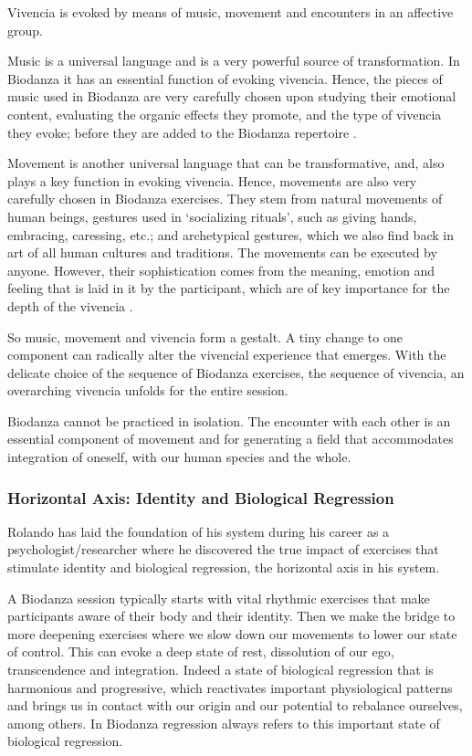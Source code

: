 \documentclass[
  11pt,
]{book}
\begin{document}
Vivencia is evoked by means of music, movement and encounters in an affective group.

Music is a universal language and is a very powerful source of transformation. In Biodanza it has an essential function of evoking vivencia. Hence, the pieces of music used in Biodanza are very carefully chosen upon studying their emotional content, evaluating the organic effects they promote, and the type of vivencia they evoke; before they are added to the Biodanza repertoire \citep{toro2008}.

Movement is another universal language that can be transformative, and, also plays a key function in evoking vivencia. Hence, movements are also very carefully chosen in Biodanza exercises. They stem from natural movements of human beings, gestures used in `socializing rituals', such as giving hands, embracing, caressing, etc.; and archetypical gestures, which we also find back in art of all human cultures and traditions. The movements can be executed by anyone. However, their sophistication comes from the meaning, emotion and feeling that is laid in it by the participant, which are of key importance for the depth of the vivencia \citep{toro2008}.

So music, movement and vivencia form a gestalt. A tiny change to one component can radically alter the vivencial experience that emerges.
With the delicate choice of the sequence of Biodanza exercises, the sequence of vivencia, an overarching vivencia unfolds for the entire session.

Biodanza cannot be practiced in isolation. The encounter with each other is an essential component of movement and for generating a field that accommodates integration of oneself, with our human species and the whole.

\hypertarget{horizontal-axis-identity-and-biological-regression}{%
\subsubsection{Horizontal Axis: Identity and Biological Regression}\label{horizontal-axis-identity-and-biological-regression}}

Rolando has laid the foundation of his system during his career as a psychologist/researcher where he discovered the true impact of exercises that stimulate identity and biological regression, the horizontal axis in his system.

A Biodanza session typically starts with vital rhythmic exercises that make participants aware of their body and their identity.
Then we make the bridge to more deepening exercises where we slow down our movements to lower our state of control. This can evoke a deep state of rest, dissolution of our ego, transcendence and integration. Indeed a state of biological regression that is harmonious and progressive, which reactivates important physiological patterns and brings us in contact with our origin and our potential to rebalance ourselves, among others. In Biodanza regression always refers to this important state of biological regression.
\end{document}
